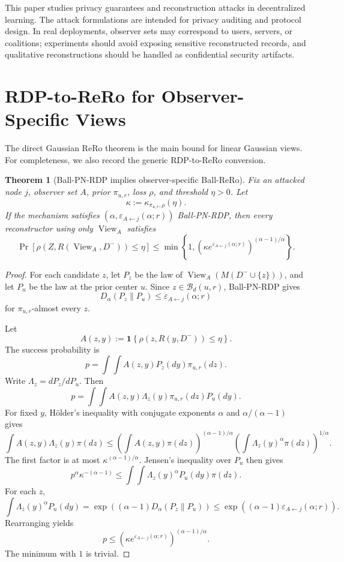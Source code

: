\documentclass[conference,compsoc]{IEEEtran}
\newtheorem{theorem}{Theorem}
\newcommand{\cB}{\mathcal{B}}
\newcommand{\eps}{\varepsilon}
\newcommand{\ind}[1]{\mathbf{1}\!\left\{#1\right\}}
\begin{document}
This paper studies privacy guarantees and reconstruction attacks in decentralized learning. The attack formulations are intended for privacy auditing and protocol design. In real deployments, observer sets may correspond to users, servers, or coalitions; experiments should avoid exposing sensitive reconstructed records, and qualitative reconstructions should be handled as confidential security artifacts.

\appendices

\section{RDP-to-ReRo for Observer-Specific Views}
\label{app:rdp-rero}

The direct Gaussian ReRo theorem is the main bound for linear Gaussian views. For completeness, we also record the generic RDP-to-ReRo conversion.

\begin{theorem}[Ball-PN-RDP implies observer-specific Ball-ReRo]
\label{thm:pn-rdp-rero}
Fix an attacked node $j$, observer set $A$, prior $\pi_{u,r}$, loss $\rho$, and threshold $\eta>0$. Let
\[
\kappa:=\kappa_{\pi_{u,r},\rho}(\eta).
\]
If the mechanism satisfies $(\alpha,\eps_{A\leftarrow j}(\alpha;r))$ Ball-PN-RDP, then every reconstructor using only $\operatorname{View}_A$ satisfies
\[
\Pr[\rho(Z,R(\operatorname{View}_A,D^-))\le\eta]
\le
\min\left\{1,\left(\kappa e^{\eps_{A\leftarrow j}(\alpha;r)}\right)^{(\alpha-1)/\alpha}\right\}.
\]
\end{theorem}

\begin{proof}
For each candidate $z$, let $P_z$ be the law of $\operatorname{View}_A(M(D^-\cup\{z\}))$, and let $P_u$ be the law at the prior center $u$. Since $z\in\cB_d(u,r)$, Ball-PN-RDP gives
\[
D_\alpha(P_z\|P_u)\le\eps_{A\leftarrow j}(\alpha;r)
\]
for $\pi_{u,r}$-almost every $z$.

Let
\[
A(z,y):=\ind{\rho(z,R(y,D^-))\le\eta}.
\]
The success probability is
\[
p=\int\int A(z,y)P_z(dy)\pi_{u,r}(dz).
\]
Write $\Lambda_z=dP_z/dP_u$. Then
\[
p=\int\int A(z,y)\Lambda_z(y)\pi_{u,r}(dz)P_u(dy).
\]
For fixed $y$, H\"older's inequality with conjugate exponents $\alpha$ and $\alpha/(\alpha-1)$ gives
\[
\int A(z,y)\Lambda_z(y)\pi(dz)
\le
\left(\int A(z,y)\pi(dz)\right)^{(\alpha-1)/\alpha}
\left(\int \Lambda_z(y)^\alpha\pi(dz)\right)^{1/\alpha}.
\]
The first factor is at most $\kappa^{(\alpha-1)/\alpha}$. Jensen's inequality over $P_u$ then gives
\[
p^\alpha\kappa^{-(\alpha-1)}
\le
\int\int \Lambda_z(y)^\alpha P_u(dy)\pi(dz).
\]
For each $z$,
\[
\int \Lambda_z(y)^\alpha P_u(dy)
=\exp((\alpha-1)D_\alpha(P_z\|P_u))
\le\exp((\alpha-1)\eps_{A\leftarrow j}(\alpha;r)).
\]
Rearranging yields
\[
p\le(\kappa e^{\eps_{A\leftarrow j}(\alpha;r)})^{(\alpha-1)/\alpha}.
\]
The minimum with $1$ is trivial.
\end{proof}
\end{document}
